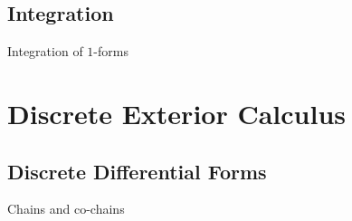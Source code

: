 \subsection{Integration}
Integration of $1$-forms
\section{Discrete Exterior Calculus}

\subsection{Discrete Differential Forms}

Chains and co-chains

